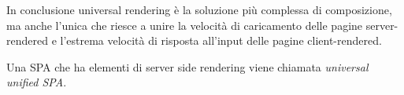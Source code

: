 In conclusione universal rendering è la soluzione più complessa di composizione, ma anche l'unica che riesce a unire la velocità di caricamento delle pagine server-rendered
e l'estrema velocità di risposta all'input delle pagine client-rendered.

Una SPA che ha elementi di server side rendering viene chiamata \emph{universal unified SPA}.
